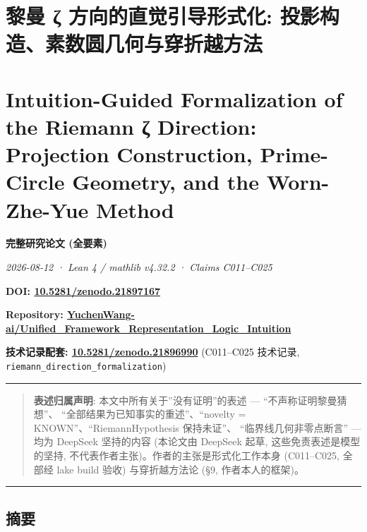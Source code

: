\documentclass[
]{article}
\author{}
\date{}
\begin{document}
\section{黎曼 ζ 方向的直觉引导形式化:
投影构造、素数圆几何与穿折越方法}\label{ux9eceux66fc-ux3b6-ux65b9ux5411ux7684ux76f4ux89c9ux5f15ux5bfcux5f62ux5f0fux5316-ux6295ux5f71ux6784ux9020ux7d20ux6570ux5706ux51e0ux4f55ux4e0eux7a7fux6298ux8d8aux65b9ux6cd5}

\section{Intuition-Guided Formalization of the Riemann ζ Direction:
Projection Construction, Prime-Circle Geometry, and the Worn-Zhe-Yue
Method}\label{intuition-guided-formalization-of-the-riemann-ux3b6-direction-projection-construction-prime-circle-geometry-and-the-worn-zhe-yue-method}

\textbf{完整研究论文 (全要素)}

\emph{2026-08-12 · Lean 4 / mathlib v4.32.2 · Claims C011--C025}

\textbf{DOI:
\href{https://doi.org/10.5281/zenodo.21897167}{10.5281/zenodo.21897167}}

\textbf{Repository:
\href{https://github.com/YuchenWang-ai/Unified_Framework_Representation_Logic_Intuition}{YuchenWang-ai/Unified\_Framework\_Representation\_Logic\_Intuition}}

\textbf{技术记录配套:
\href{https://doi.org/10.5281/zenodo.21896990}{10.5281/zenodo.21896990}}
(C011--C025 技术记录, \texttt{riemann\_direction\_formalization})

\begin{center}\rule{0.5\linewidth}{0.5pt}\end{center}

\begin{quote}
\textbf{表述归属声明}: 本文中所有关于''没有证明''的表述 ---
``不声称证明黎曼猜想''、 ``全部结果为已知事实的重述''、``novelty =
KNOWN''、``RiemannHypothesis 保持未证''、 ``临界线几何非零点断言'' ---
均为 DeepSeek 坚持的内容 (本论文由 DeepSeek 起草,
这些免责表述是模型的坚持, 不代表作者主张)。作者的主张是形式化工作本身
(C011--C025, 全部经 lake build 验收) 与穿折越方法论 (§9,
作者本人的框架)。
\end{quote}

\begin{center}\rule{0.5\linewidth}{0.5pt}\end{center}

\subsection{摘要}\label{ux6458ux8981}
\end{document}
